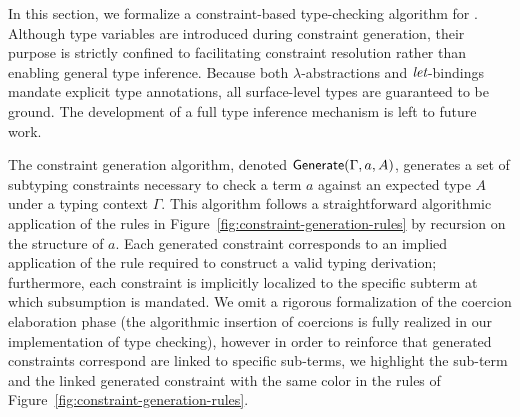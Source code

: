 \documentclass[pdflatex,sn-mathphys-num]{sn-jnl}%
\theoremstyle{thmstyleone}%
\theoremstyle{thmstyletwo}%
\theoremstyle{thmstylethree}%
\begin{document}
In this section, we formalize a constraint-based type-checking algorithm for \lcataSub.
Although type variables are introduced during constraint generation, their purpose is strictly confined to facilitating constraint resolution rather than enabling general type inference.
Because both $\lambda$-abstractions and $\textit{let}$-bindings mandate explicit type annotations, all surface-level types are guaranteed to be ground.
The development of a full type inference mechanism is left to future work.

The constraint generation algorithm, denoted $\textsf{Generate}(\Gamma, a, A)$, generates a set of subtyping constraints necessary to check a term $a$ against an expected type $A$ under a typing context $\Gamma$.
This algorithm follows a straightforward algorithmic application of the rules in Figure~\ref{fig:constraint-generation-rules} by recursion on the structure of $a$.
Each generated constraint corresponds to an implied application of the  rule required to construct a valid typing derivation; furthermore, each constraint is implicitly localized to the specific subterm at which subsumption is mandated.
We omit a rigorous formalization of the coercion elaboration phase (the algorithmic insertion of coercions is fully realized in our implementation of type checking), however in order to reinforce that generated constraints correspond are linked to specific sub-terms, we highlight the sub-term and the linked generated constraint with the same color in the rules of Figure~\ref{fig:constraint-generation-rules}.
\end{document}
